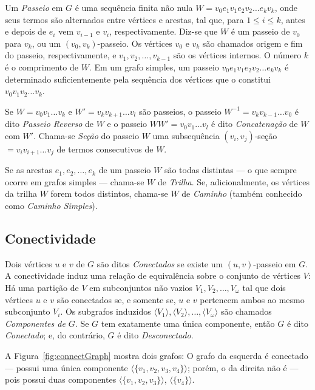 Um \textit{Passeio} em $G$ é uma sequência finita não nula $W = v_0e_1v_1e_2v_2\dots e_kv_k$, onde seus termos são alternados entre vértices e arestas, tal que, para $1\leq i \leq k$, antes e depois de $e_i$ vem $v_{i-1}$ e $v_i$, respectivamente. Diz-se que $W$ é um passeio de $v_0$ para $v_k$, ou um $(v_0,v_k)$-passeio. Os vértices $v_0$ e $v_k$ são chamados origem e fim do passeio, respectivamente, e $v_1,v_2,\dots,v_{k-1}$ são os vértices internos. O número $k$ é o comprimento de $W$. 
Em um grafo simples, um passeio $v_0e_1v_1e_2v_2\dots e_kv_k$ é determinado suficientemente pela sequência dos vértices que o constitui $v_0v_1v_2\dots v_k$.

Se $W=v_0v_1\dots v_k$ e $W' = v_kv_{k+1}\dots v_l$ são passeios, o passeio $W^{-1} = v_kv_{k-1}\dots v_0$ é dito \textit{Passeio Reverso} de $W$ e o passeio $WW' = v_0v_1\dots v_l$ é dito \textit{Concatenação} de $W$ com $W'$. Chama-se \textit{Seção} do passeio $W$ uma subsequência $(v_i,v_j)$-seção $= v_iv_{i+1}\dots v_j$ de termos consecutivos de $W$. 

Se as arestas $e_1,e_2,\dots,e_k$ de um passeio $W$ são todas distintas --- o que sempre ocorre em grafos simples --- chama-se $W$ de \textit{Trilha}.  Se, adicionalmente, os vértices da trilha $W$ forem todos distintos, chama-se $W$ de \textit{Caminho} (também conhecido como \textit{Caminho Simples}).

\subsection*{Conectividade}

Dois vértices $u$ e $v$ de $G$ são ditos \textit{Conectados} se existe um $(u,v)$-passeio em $G$. A conectividade induz uma relação de equivalência sobre o conjunto de vértices $V$: Há uma partição de $V$ em subconjuntos não vazios $V_1, V_2, \dots, V_\omega$ tal que dois vértices $u$ e $v$ são conectados se, e somente se, $u$ e $v$ pertencem ambos ao mesmo subconjunto $V_i$. Os subgrafos induzidos $\langle V_1\rangle, \langle V_2\rangle, \dots,\langle V_\omega\rangle$ são chamados \textit{Componentes de $G$}. Se $G$ tem exatamente uma única componente, então $G$ é dito \textit{Conectado}; e, do contrário, $G$ é dito \textit{Desconectado}. 

A Figura~\ref{fig:connectGraph} mostra dois grafos: O grafo da esquerda é conectado --- possui uma única componente $\langle \{v_1,v_2,v_3,v_4\}\rangle$; porém, o da direita não é --- pois possui duas componentes $\langle \{v_1,v_2,v_3\}\rangle$, $\langle \{v_4\}\rangle$.

